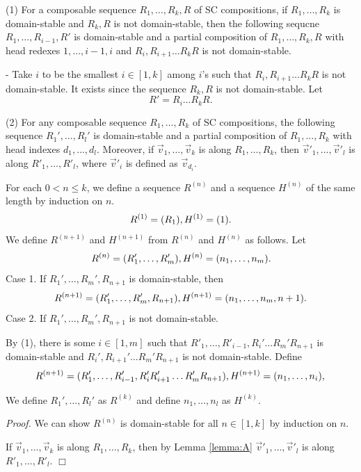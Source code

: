 \begin{Prop}\label{prop:domain-stable}
(1) For a composable sequence $R_1,\ldots,R_k,R$ of SC compositions,
if $R_1,\ldots,R_k$ is domain-stable
and $R_k,R$ is not domain-stable, then
the following sequcne $R_1,\ldots,R_{i-1},R'$ is
domain-stable and a partial composition of $R_1,\ldots,R_k,R$
with head redexes $1,\ldots,i-1,i$ and $R_{i},R_{i+1}\ldots R_k R$ is
not domain-stable.

- Take $i$ to be the smallest $i \in [1,k]$ among $i$'s such that
$R_i, R_{i+1} \ldots R_k R$ is not domain-stable.
It exists since the sequence $R_k,R$ is not domain-stable.
Let
\[
R' = R_i\ldots R_k R.
\]

(2) For any composable sequence $R_1,\ldots,R_k$ of SC compositions,
the following sequence $R_1',\ldots,R_l'$ 
is domain-stable and
a partial composition of 
$R_1,\ldots,R_k$ with head indexes $d_1,\ldots,d_l$.
Moreover,
if $\Vec v_1,\ldots,\Vec v_k$ is along $R_1,\ldots,R_k$,
then $\Vec v'_1,\ldots,\Vec v'_l$ is along $R'_1,\ldots,R'_l$,
where $\Vec v'_i$ is defined as $\Vec v_{d_i}$.

For each $0 < n \le k$, we define a sequence $R^{(n)}$ and 
a sequence $H^{(n)}$ of the same length by induction on $n$.
\[
R^{(1)} = (R_1), \\ 
H^{(1)} = (1).
\]
We define $R^{(n+1)}$ and $H^{(n+1)}$ from $R^{(n)}$ and $H^{(n)}$ as follows.
Let
\[
R^{(n)} = (R_1',\ldots,R_m'), \\
H^{(n)} = (n_1,\ldots,n_m).
\]
Case 1. If $R_1',\ldots,R_m',R_{n+1}$ is domain-stable,
then
\[
R^{(n+1)} = (R_1',\ldots,R_m',R_{n+1}), \\
H^{(n+1)} = (n_1,\ldots,n_m,n+1).
\]
Case 2. If $R_1',\ldots,R_m',R_{n+1}$ is not domain-stable.

By (1), there is some $i \in [1,m]$ such that
$R'_1,\ldots,R'_{i-1}, R_i'\ldots R_m'R_{n+1}$ is domain-stable
and $R_i',R_{i+1}'\ldots R_m'R_{n+1}$ is not domain-stable.
Define
\[
R^{(n+1)} = (R_1',\ldots,R_{i-1}',R_i'R'_{i+1}\ldots R'_m R_{n+1}), \\
H^{(n+1)} = (n_1,\ldots,n_{i}), \\
\]

We define $R_1',\ldots,R_l'$ as $R^{(k)}$
and define $n_1,\ldots,n_l$ as $H^{(k)}$.
\end{Prop}

{\em Proof.}
We can show $R^{(n)}$ is domain-stable for all $n \in [1,k]$
by induction on $n$.

If $\Vec v_1,\ldots,\Vec v_k$ is along $R_1,\ldots,R_k$,
then by Lemma \ref{lemma:A} $\Vec v'_1,\ldots,\Vec v'_l$ is along $R'_1,\ldots,R'_l$.
$\Box$


